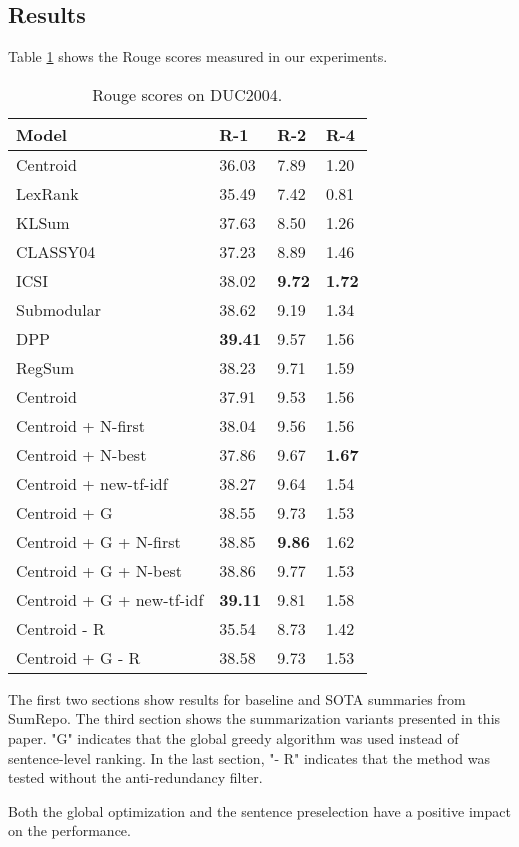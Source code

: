 \documentclass[11pt,letterpaper]{article}
\begin{document}
\subsection*{Results}
Table \ref{results} shows the Rouge scores measured in our experiments. 
\begin{table}[t]
	\centering
	\begin{tabular}{l|lll}
		\hline
		Model & R-1 & R-2 & R-4 \\ \hline
		Centroid & 36.03 & 7.89 & 1.20 \\
		LexRank & 35.49 & 7.42 & 0.81 \\
		KLSum & 37.63 & 8.50 & 1.26 \\ \hline
		CLASSY04 & 37.23 & 8.89 & 1.46 \\
		ICSI & 38.02 & \textbf{9.72} & \textbf{1.72} \\
		Submodular & 38.62 & 9.19 & 1.34 \\
		DPP & \textbf{39.41} & 9.57 & 1.56 \\
		RegSum & 38.23 & 9.71 & 1.59 \\ \hline
		Centroid & 37.91 & 9.53 & 1.56 \\
		Centroid + N-first & 38.04 & 9.56 & 1.56 \\
		Centroid + N-best & 37.86 & 9.67 &  \textbf{1.67} \\
		Centroid + new-tf-idf & 38.27 & 9.64 & 1.54 \\
		Centroid + G & 38.55 & 9.73 & 1.53 \\
		Centroid + G + N-first & 38.85 & \textbf{9.86} & 1.62 \\
		Centroid + G + N-best & 38.86 & 9.77 & 1.53 \\
		Centroid + G + new-tf-idf & \textbf{39.11} & 9.81 & 1.58 \\ \hline
		Centroid - R & 35.54 & 8.73 & 1.42 \\
		Centroid + G - R & 38.58 & 9.73 & 1.53
	\end{tabular}
	\caption{Rouge scores on DUC2004.}
	\label{results}
\end{table}
The first two sections show results for baseline and SOTA summaries from SumRepo. The third section shows the summarization variants presented in this paper. "G" indicates that the global greedy algorithm was used instead of sentence-level ranking. In the last section, "- R" indicates that the method was tested without the anti-redundancy filter.

Both the global optimization and the sentence preselection have a positive impact on the performance. 
\end{document}
